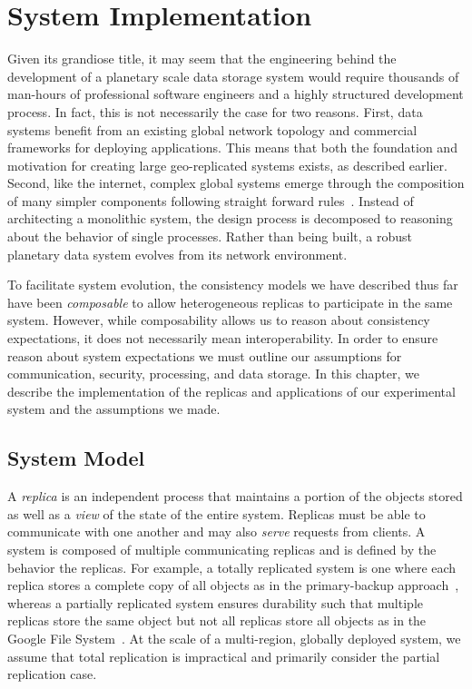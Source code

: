 
\renewcommand{\thechapter}{5}

\chapter{System Implementation}

Given its grandiose title, it may seem that the engineering behind the development of a planetary scale data storage system would require thousands of man-hours of professional software engineers and a highly structured development process.
In fact, this is not necessarily the case for two reasons.
First, data systems benefit from an existing global network topology and commercial frameworks for deploying applications.
This means that both the foundation and motivation for creating large geo-replicated systems exists, as described earlier.
Second, like the internet, complex global systems emerge through the composition of many simpler components following straight forward rules~\cite{internet}.
Instead of architecting a monolithic system, the design process is decomposed to reasoning about the behavior of single processes.
Rather than being built, a robust planetary data system evolves from its network environment.

To facilitate system evolution, the consistency models we have described thus far have been \emph{composable} to allow heterogeneous replicas to participate in the same system.
However, while composability allows us to reason about consistency expectations, it does not necessarily mean interoperability.
In order to ensure reason about system expectations we must outline our assumptions for communication, security, processing, and data storage.
In this chapter, we describe the implementation of the replicas and applications of our experimental system and the assumptions we made.


\section{System Model}

A \emph{replica} is an independent process that maintains a portion of the objects stored as well as a \emph{view} of the state of the entire system.
Replicas must be able to communicate with one another and may also \emph{serve} requests from clients.
A system is composed of multiple communicating replicas and is defined by the behavior the replicas.
For example, a totally replicated system is one where each replica stores a complete copy of all objects as in the primary-backup approach~\cite{primary_backup}, whereas a partially replicated system ensures durability such that multiple replicas store the same object but not all replicas store all objects as in the Google File System~\cite{gfs}.
At the scale of a multi-region, globally deployed system, we assume that total replication is impractical and primarily consider the partial replication case.

